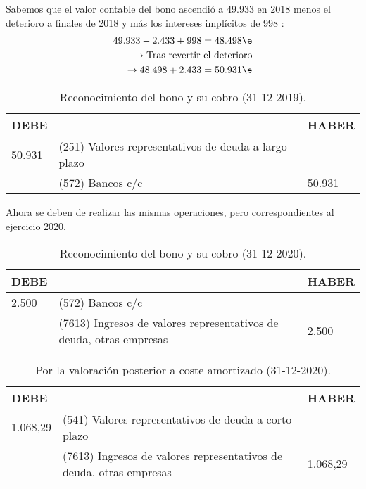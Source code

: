 Sabemos que el valor contable del bono ascendió a 49.933 en 2018 menos el deterioro a finales de 2018 y más los intereses implícitos de 998 \e:
\begin{align*}
    49.933 - 2.433 + 998 = 48.498 \e \\
    \rightarrow \text{Tras revertir el deterioro} \\ \rightarrow 48.498 + 2.433 = 50.931 \e 
\end{align*}

\begin{table}[H]
    \centering
    \begin{tabular}{|p{2cm}|p{6cm}|p{2cm}|}
    \hline
    \rowcolor{blue!30}
    \textbf{DEBE} & \textbf{} & \textbf{HABER} \\
    \hline
    50.931 & (251) Valores representativos de deuda a largo plazo & \\
    \hline
    & (572) Bancos c/c & 50.931 \\
    \hline
    \end{tabular}
    \caption{Reconocimiento del bono y su cobro (31-12-2019).}
    \label{tabla:reconocimiento_bono_2019}
\end{table}

Ahora se deben de realizar las mismas operaciones, pero correspondientes al ejercicio 2020.

\begin{table}[H]
    \centering
    \begin{tabular}{|p{2cm}|p{6cm}|p{2cm}|}
    \hline
    \rowcolor{blue!30}
    \textbf{DEBE} & \textbf{} & \textbf{HABER} \\
    \hline
    2.500 & (572) Bancos c/c & \\
    \hline
    & (7613) Ingresos de valores representativos de deuda, otras empresas & 2.500 \\
    \hline
    \end{tabular}
    \caption{Reconocimiento del bono y su cobro (31-12-2020).}
    \label{tabla:reconocimiento_bono_2020}
\end{table}

\begin{table}[H]
    \centering
    \begin{tabular}{|p{2cm}|p{6cm}|p{2cm}|}
    \hline
    \rowcolor{blue!30}
    \textbf{DEBE} & \textbf{} & \textbf{HABER} \\
    \hline
    1.068,29 & (541) Valores representativos de deuda a corto plazo & \\
    \hline
    & (7613) Ingresos de valores representativos de deuda, otras empresas & 1.068,29 \\
    \hline
    \end{tabular}
    \caption{Por la valoración posterior a coste amortizado (31-12-2020).}
    \label{tabla:valoracion_posterior}
\end{table}

